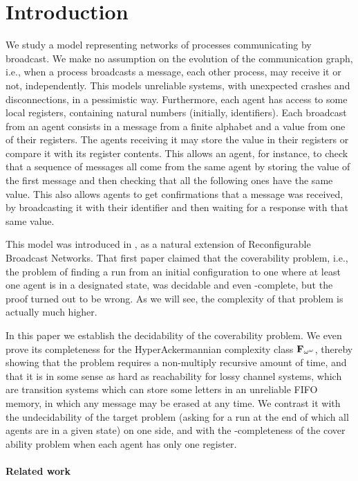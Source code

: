 \section{Introduction}

We study a model representing networks of processes communicating by broadcast. We make no assumption on the evolution of the communication graph, i.e., when a process broadcasts a message, each other process, may receive it or not, independently. This models unreliable systems, with unexpected crashes and disconnections, in a pessimistic way. 
Furthermore, each agent has access to some local registers, containing natural numbers (initially, identifiers). Each broadcast from an agent consists in a message from a finite alphabet and a value from one of their registers. The agents receiving it may store the value in their registers or compare it with its register contents. 
This allows an agent, for instance, to check that a sequence of messages all come from the same agent by storing the value of the first message and then checking that all the following ones have the same value.
This also allows agents to get confirmations that a message was received, by broadcasting it with their identifier and then waiting for a response with that same value.

This model was introduced in \cite{DST2013}, as a natural extension of Reconfigurable Broadcast Networks. That first paper claimed that the coverability problem, i.e., the problem of finding a run from an initial configuration to one where at least one agent is in a designated state, was decidable and even \PSPACE-complete, but the proof turned out to be wrong. As we will see, the complexity of that problem is actually much higher.

In this paper we establish the decidability of the coverability problem. We even prove its completeness for the HyperAckermannian complexity class $\mathbf{F}_{\omega^\omega}$, thereby showing that the problem requires a non-multiply recursive amount of time, and that it is in some sense as hard as reachability for lossy channel systems, which are transition systems which can store some letters in an unreliable FIFO memory, in which any message may be erased at any time. 
We contrast it with the undecidability of the target problem (asking for a run at the end of which all agents are in a given state) on one side, and with the \NP-completeness of the cover ability problem when each agent has only one register. 

\paragraph*{Related work}

